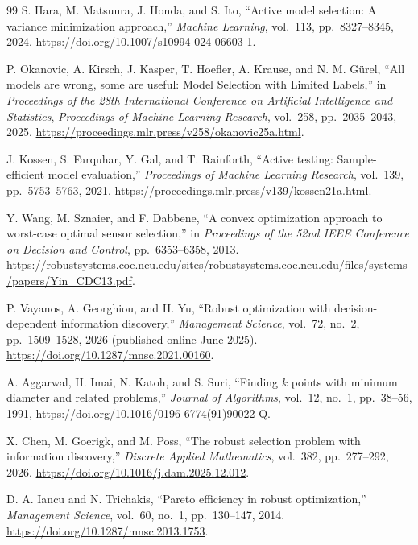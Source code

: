\documentclass[12pt]{article}
\begin{document}
\begin{thebibliography}{99}
 S. Hara, M. Matsuura, J. Honda, and S. Ito,
``Active model selection: A variance minimization approach,''
\emph{Machine Learning}, vol.~113, pp.~8327--8345, 2024.
\url{https://doi.org/10.1007/s10994-024-06603-1}.

 P. Okanovic, A. Kirsch, J. Kasper, T. Hoefler,
A. Krause, and N. M. G\"urel, ``All models are wrong, some are useful:
Model Selection with Limited Labels,'' in \emph{Proceedings of the 28th
International Conference on Artificial Intelligence and Statistics},
\emph{Proceedings of Machine Learning Research}, vol.~258, pp.~2035--2043,
2025. \url{https://proceedings.mlr.press/v258/okanovic25a.html}.

 J. Kossen, S. Farquhar, Y. Gal, and
T. Rainforth, ``Active testing: Sample-efficient model evaluation,''
\emph{Proceedings of Machine Learning Research}, vol.~139,
pp.~5753--5763, 2021.
\url{https://proceedings.mlr.press/v139/kossen21a.html}.

 Y. Wang, M. Sznaier, and F. Dabbene,
``A convex optimization approach to worst-case optimal sensor selection,''
in \emph{Proceedings of the 52nd IEEE Conference on Decision and Control},
pp.~6353--6358, 2013.
\url{https://robustsystems.coe.neu.edu/sites/robustsystems.coe.neu.edu/files/systems/papers/Yin_CDC13.pdf}.

 P. Vayanos, A. Georghiou, and H. Yu,
``Robust optimization with decision-dependent information discovery,''
\emph{Management Science}, vol.~72, no.~2, pp.~1509--1528, 2026
(published online June 2025).
\url{https://doi.org/10.1287/mnsc.2021.00160}.

 A. Aggarwal, H. Imai, N. Katoh, and S. Suri, ``Finding
$k$ points with minimum diameter and related problems,'' \emph{Journal of
Algorithms}, vol.~12, no.~1, pp.~38--56, 1991,
\url{https://doi.org/10.1016/0196-6774(91)90022-Q}.

 X. Chen, M. Goerigk, and M. Poss, ``The robust selection
problem with information discovery,'' \emph{Discrete Applied Mathematics},
vol.~382, pp.~277--292, 2026. \url{https://doi.org/10.1016/j.dam.2025.12.012}.

 D. A. Iancu and N. Trichakis, ``Pareto efficiency in robust
optimization,'' \emph{Management Science}, vol.~60, no.~1, pp.~130--147, 2014.
\url{https://doi.org/10.1287/mnsc.2013.1753}.



\end{thebibliography}
\end{document}
